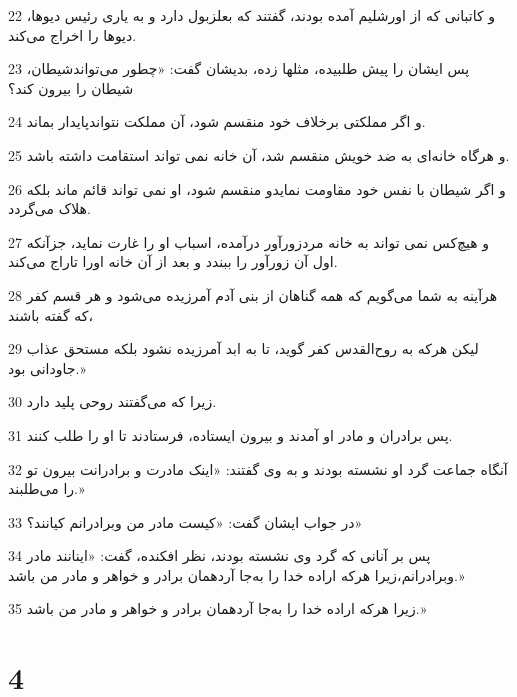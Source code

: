 \par 22 و کاتبانی که از اورشلیم آمده بودند، گفتند که بعلزبول دارد و به یاری رئیس دیوها، دیوها را اخراج می‌کند.
\par 23 پس ایشان را پیش طلبیده، مثلها زده، بدیشان گفت: «چطور می‌تواندشیطان، شیطان را بیرون کند؟
\par 24 و اگر مملکتی برخلاف خود منقسم شود، آن مملکت نتواندپایدار بماند.
\par 25 و هرگاه خانه‌ای به ضد خویش منقسم شد، آن خانه نمی تواند استقامت داشته باشد.
\par 26 و اگر شیطان با نفس خود مقاومت نمایدو منقسم شود، او نمی تواند قائم ماند بلکه هلاک می‌گردد.
\par 27 و هیچ‌کس نمی تواند به خانه مردزورآور درآمده، اسباب او را غارت نماید، جزآنکه اول آن زورآور را ببندد و بعد از آن خانه اورا تاراج می‌کند.
\par 28 هرآینه به شما می‌گویم که همه گناهان از بنی آدم آمرزیده می‌شود و هر قسم کفر که گفته باشند،
\par 29 لیکن هر‌که به روح‌القدس کفر گوید، تا به ابد آمرزیده نشود بلکه مستحق عذاب جاودانی بود.»
\par 30 زیرا که می‌گفتند روحی پلید دارد.
\par 31 پس برادران و مادر او آمدند و بیرون ایستاده، فرستادند تا او را طلب کنند.
\par 32 آنگاه جماعت گرد او نشسته بودند و به وی گفتند: «اینک مادرت و برادرانت بیرون تو را می‌طلبند.»
\par 33 در جواب ایشان گفت: «کیست مادر من وبرادرانم کیانند؟»
\par 34 پس بر آنانی که گرد وی نشسته بودند، نظر افکنده، گفت: «اینانند مادر وبرادرانم،زیرا هر‌که اراده خدا را به‌جا آردهمان برادر و خواهر و مادر من باشد.»
\par 35 زیرا هر‌که اراده خدا را به‌جا آردهمان برادر و خواهر و مادر من باشد.»

\chapter{4}

